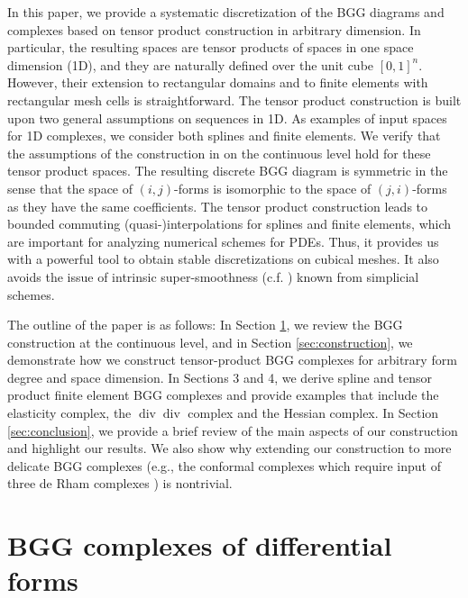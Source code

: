 \documentclass[final]{amsart}%
\newcommand{\0}{\mathaccent23}
\renewcommand\div{\operatorname{div}}
\begin{document}
In this paper, we provide a systematic discretization of the BGG diagrams and complexes based on tensor product construction in arbitrary dimension. In particular, the resulting spaces are tensor products of spaces in one space dimension (1D), and they are naturally defined over the unit cube $[0,1]^n$. However, their extension to rectangular domains and to finite elements with rectangular mesh cells is straightforward.
The tensor product construction is built upon two general assumptions on sequences in 1D. As examples of input spaces for 1D complexes, we consider both splines and finite elements. We verify that the assumptions of the construction in \cite{arnold2021complexes} on the continuous level hold for these tensor product spaces.
The resulting discrete BGG diagram is symmetric in the sense that the space of $(i, j)$-forms is isomorphic to the space of $(j, i)$-forms as they have the same coefficients.
The tensor product construction leads to bounded commuting (quasi-)interpolations for splines and finite elements, which are important for analyzing numerical schemes for PDEs.
Thus, it provides us with a powerful tool to obtain stable 
discretizations on cubical meshes. It also avoids the issue of intrinsic super-smoothness (c.f. \cite{floater2020characterization}) known from simplicial schemes.

The outline of the paper is as follows: In Section \ref{sec:review-bgg}, we review the BGG construction at the continuous level, and in Section \ref{sec:construction}, we demonstrate how we construct tensor-product BGG complexes for arbitrary form degree and space dimension.  In Sections 3 and 4, we derive spline and tensor product finite element BGG complexes and provide examples that include the elasticity complex, the $\div\div$ complex and the Hessian complex.  In Section \ref{sec:conclusion}, we provide a brief review of the main aspects of our construction and highlight our results. We also show why extending our construction to more delicate BGG complexes (e.g., the conformal complexes which require input of three de Rham complexes \cite{vcap2022bgg}) is nontrivial.


\section{BGG complexes of differential forms}
\label{sec:review-bgg}
\end{document}
